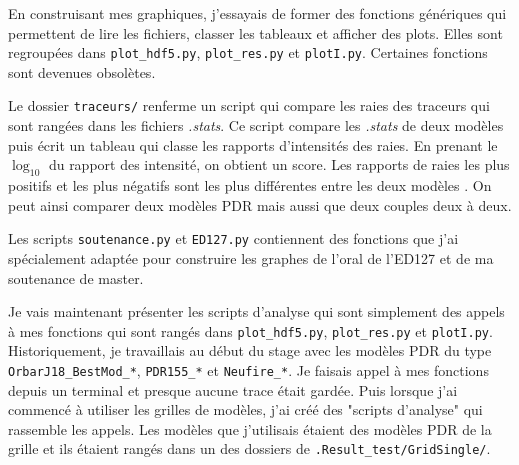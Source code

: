 \documentclass[11pt,a4paper,twoside,openright]{article}
\begin{document}
\begin{spacing}{0.98}
En construisant mes graphiques, j'essayais de former des fonctions génériques qui permettent de lire les fichiers, classer les tableaux et afficher des plots. Elles sont regroupées dans \texttt{plot\_hdf5.py}, \texttt{plot\_res.py} et \texttt{plotI.py}. Certaines fonctions sont devenues obsolètes. \newline

Le dossier \texttt{traceurs/} renferme un script qui compare les raies des traceurs qui sont rangées dans les fichiers \textit{.stats}. Ce script compare les \textit{.stats} de deux modèles puis écrit un tableau qui classe les rapports d'intensités des raies. En prenant le $\log_{10}$ du rapport des intensité, on obtient un score. Les rapports de raies les plus positifs et les plus négatifs sont les plus différentes entre les deux modèles . On peut ainsi comparer deux modèles PDR mais aussi que deux couples deux à deux. \newline 

Les scripts \texttt{soutenance.py} et \texttt{ED127.py} contiennent des fonctions que j'ai spécialement adaptée pour construire les graphes de l'oral de l'ED127 et de ma soutenance de master. \newline

Je vais maintenant présenter les scripts d'analyse qui sont simplement des appels à mes fonctions qui sont rangés dans \texttt{plot\_hdf5.py}, \texttt{plot\_res.py} et \texttt{plotI.py}. Historiquement, je travaillais au début du stage avec les modèles PDR du type \texttt{OrbarJ18\_BestMod\_*}, \texttt{PDR155\_*} et \texttt{Neufire\_*}. Je faisais appel à mes fonctions depuis un terminal et presque aucune trace était gardée. Puis lorsque j'ai commencé à utiliser les grilles de modèles, j'ai créé des "scripts d'analyse" qui rassemble les appels. Les modèles que j'utilisais étaient des modèles PDR de la grille et ils étaient rangés dans un des dossiers de \texttt{.Result\_test/GridSingle/}.


\end{spacing}
\end{document}
